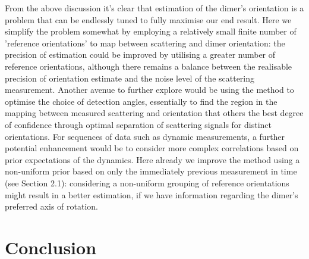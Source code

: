 From the above discussion it’s clear that estimation of the dimer’s orientation is a problem that can be endlessly tuned to fully maximise our end result. Here we simplify the problem somewhat by employing a relatively small finite number of 'reference orientations' to map between scattering and dimer orientation: the precision of estimation could be improved by utilising a greater number of reference orientations, although there remains a balance between the realisable precision of orientation estimate and the noise level of the scattering measurement. Another avenue to further explore would be using the method to optimise the choice of detection angles, essentially to find the region in the mapping between measured scattering and orientation that others the best degree of confidence through optimal separation of scattering signals for distinct orientations. For sequences of data such as dynamic measurements, a further potential enhancement would be to consider more complex correlations based on prior expectations of the dynamics. Here already we improve the method using a non-uniform prior based on only the immediately previous measurement in time (see Section 2.1): considering a non-uniform grouping of reference orientations might result in a better estimation, if we have information regarding the dimer’s preferred axis of rotation. 

\section{Conclusion}
\label{sec:Conclusion}

